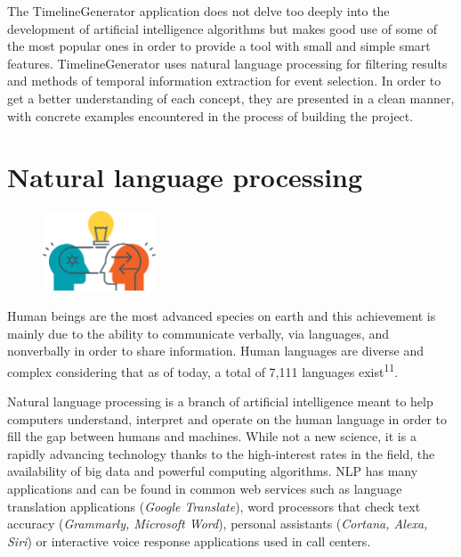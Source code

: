 \documentclass{report}
\begin{document}
The TimelineGenerator application does not delve too deeply into the development of artificial intelligence algorithms but makes good use of some of the most popular ones in order to provide a tool with small and simple smart features. TimelineGenerator uses natural language processing for filtering results and methods of temporal information extraction for event selection. In order to get a better understanding of each concept, they are presented in a clean manner, with concrete examples encountered in the process of building the project.

\section{Natural language processing}
\begin{figure}
	\vspace*{-1.5cm}
    \centering
    \includegraphics[width=0.3\textwidth]{nlp}
	\vspace{-10pt} 
\end{figure}
Human beings are the most advanced species on earth and this achievement is mainly due to the ability to communicate verbally, via languages, and nonverbally in order to share information. Human languages are diverse and complex considering that as of today, a total of 7,111 languages exist\textsuperscript{11}.\par

Natural language processing is a branch of artificial intelligence meant to help computers understand, interpret and operate on the human language in order to fill the gap between humans and machines. While not a new science, it is a rapidly advancing technology thanks to the high-interest rates in the field, the availability of big data and powerful computing algorithms. NLP has many applications and can be found in common web services such as language translation applications (\textit{Google Translate}), word processors that check text accuracy (\textit{Grammarly, Microsoft Word}), personal assistants (\textit{Cortana, Alexa, Siri}) or interactive voice response applications used in call centers. \par
\end{document}

